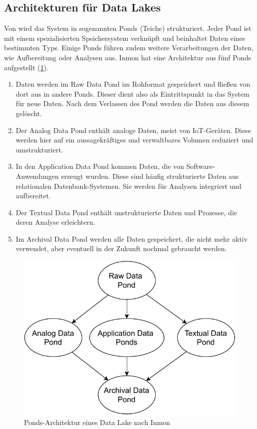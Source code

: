 \subsection{Architekturen für Data Lakes}
Von \textcite{inmon2016data} wird das System in sogenannten Ponds (Teiche) strukturiert.
Jeder Pond ist mit einem spezialisierten Speichersystem verknüpft und beinhaltet Daten eines bestimmten Typs.
Einige Ponds führen zudem weitere Verarbeitungen der Daten, wie Aufbereitung oder Analysen aus.
Inmon hat eine Architektur aus fünf Ponds aufgestellt (\cref{fig:datalake-ponds}).
\begin{enumerate}
    \item Daten werden im Raw Data Pond im Rohformat gespeichert und fließen von dort aus in andere Ponds.
          Dieser dient also als Eintrittspunkt in das System für neue Daten.
          Nach dem Verlassen des Pond werden die Daten aus diesem gelöscht.
    \item Der Analog Data Pond enthält analoge Daten, meist von IoT-Geräten.
          Diese werden hier auf ein aussagekräftiges und verwaltbares Volumen reduziert und umstrukturiert.
    \item In den Application Data Pond kommen Daten, die von Software-Anwendungen erzeugt wurden.
          Diese sind häufig strukturierte Daten aus relationalen Daten\-bank-Systemen.
          Sie werden für Analysen integriert und aufbereitet.
    \item Der Textual Data Pond enthält unstrukturierte Daten und Prozesse, die deren Analyse erleichtern.
    \item Im Archival Data Pond werden alle Daten gespeichert, die nicht mehr aktiv verwendet, aber eventuell in der Zukunft nochmal gebraucht werden.
\end{enumerate}
\begin{figure}
    \centering
    \includegraphics[width=.8\textwidth]{Grafiken/Grundlagen-Ponds.pdf}
    \caption{Ponds-Architektur eines Data Lake nach Inmon}
    \label{fig:datalake-ponds}
\end{figure}


